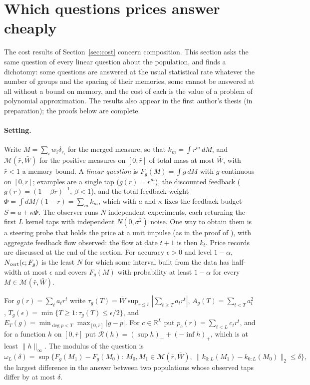 \documentclass[12pt]{article}
\theoremstyle{definition}
\theoremstyle{remark}
\begin{document}
\section{Which questions prices answer cheaply}\label{app:questions}

The cost results of Section~\ref{sec:cost} concern composition. This section asks the same question of every linear question about the population, and finds a dichotomy: some questions are answered at the usual statistical rate whatever the number of groups and the spacing of their memories, some cannot be answered at all without a bound on memory, and the cost of each is the value of a problem of polynomial approximation. The results also appear in the first author's thesis (in preparation); the proofs below are complete.

\paragraph{Setting.} Write $M=\sum_iw_i\delta_{r_i}$ for the merged measure, so that $k_m=\int r^m\,dM$, and $\mathcal M(\bar r,\bar W)$ for the positive measures on $[0,\bar r]$ of total mass at most $\bar W$, with $\bar r<1$ a memory bound. A \emph{linear question} is $F_g(M)=\int g\,dM$ with $g$ continuous on $[0,\bar r]$; examples are a single tap ($g(r)=r^m$), the discounted feedback ($g(r)=(1-\beta r)^{-1}$, $\beta<1$), and the total feedback weight $\Phi=\int dM/(1-r)=\sum_m k_m$, which with $a$ and $\kappa$ fixes the feedback budget $S=a+\kappa\Phi$. The observer runs $N$ independent experiments, each returning the first $L$ kernel taps with independent $N(0,\sigma^2)$ noise. One way to obtain them is a steering probe that holds the price at a unit impulse (as in the proof of \citealp[Theorem~S6.7]{niroula2026full}), with aggregate feedback flow observed: the flow at date $t+1$ is then $k_t$. Price records are discussed at the end of the section. For accuracy $\epsilon>0$ and level $1-\alpha$, $N_{\rm cert}(\epsilon;F_g)$ is the least $N$ for which some interval built from the data has half-width at most $\epsilon$ and covers $F_g(M)$ with probability at least $1-\alpha$ for every $M\in\mathcal M(\bar r,\bar W)$.

For $g(r)=\sum_ta_tr^t$ write $\tau_g(T)=\bar W\sup_{r\le\bar r}|\sum_{t\ge T}a_tr^t|$, $A_g(T)=\sum_{t<T}a_t^2$, $T_g(\epsilon)=\min\{T\ge1:\tau_g(T)\le\epsilon/2\}$, and $E_T(g)=\min_{\deg p<T}\max_{[0,\bar r]}|g-p|$. For $c\in\mathbb R^L$ put $p_c(r)=\sum_{t<L}c_tr^t$, and for a function $h$ on $[0,\bar r]$ put $\mathcal R(h)=(\sup h)_++(-\inf h)_+$, which is at least $\|h\|_\infty$. The modulus of the question is
\[
 \omega_L(\delta)=\sup\bigl\{F_g(M_1)-F_g(M_0):\ M_0,M_1\in\mathcal M(\bar r,\bar W),\ \|k_{0:L}(M_1)-k_{0:L}(M_0)\|_2\le\delta\bigr\},
\]
the largest difference in the answer between two populations whose observed taps differ by at most $\delta$.
\end{document}
